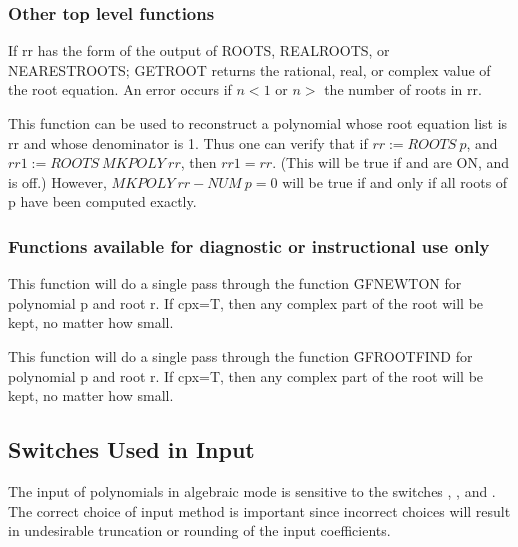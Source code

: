 \subsubsection{Other top level functions}

\begin{description}
   
\item[GETROOT(n,rr);] If rr has the form of the output of ROOTS, REALROOTS,
or NEARESTROOTS; GETROOT returns the rational, real, or complex value of
the root equation.  An error occurs if $n<1$ or $n>$ the number of roots in
rr.

\item[MKPOLY rr;] This function can be used to reconstruct a polynomial
whose root equation list is rr and whose denominator is 1.  Thus one can
verify that if $rr := ROOTS~p$, and $rr1 := ROOTS~MKPOLY~rr$, then
$rr1 = rr$. (This will be true if  and  are ON,
and  is off.)
However, $MKPOLY~rr - NUM~p = 0$ will be true if and only if all roots of p
have been computed exactly.

\end{description}

\subsubsection{Functions available for diagnostic or instructional use only}

\begin{description}
\item[GFNEWT(p,r,cpx);] This function will do a single pass through the
function \f{GFNEWTON} for polynomial p and root r.  If cpx=T, then any
complex part of the root will be kept, no matter how small.

\item[GFROOT(p,r,cpx);] This function will do a single pass through the
function \f{GFROOTFIND} for polynomial p and root r.  If cpx=T, then any
complex part of the root will be kept, no matter how small.
\end{description}

\subsection{Switches Used in Input}

The input of polynomials in algebraic mode is sensitive to the switches
, , and .  The correct choice of
input method is important since incorrect choices will result in
undesirable truncation or rounding of the input coefficients.

